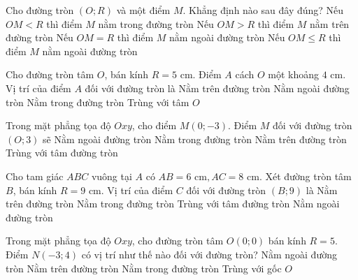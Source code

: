 \begin{ex}%
	Cho đường tròn $(O; R)$ và một điểm $M$. Khẳng định nào sau đây đúng?
	\choice
	{\True Nếu $OM < R$ thì điểm $M$ nằm trong đường tròn}
	{Nếu $OM > R$ thì điểm $M$ nằm trên đường tròn}
	{Nếu $OM = R$ thì điểm $M$ nằm ngoài đường tròn}
	{Nếu $OM \le R$ thì điểm $M$ nằm ngoài đường tròn}
\end{ex}

\begin{ex}%
	Cho đường tròn tâm $O$, bán kính $R = 5\text{ cm}$. Điểm $A$ cách $O$ một khoảng $4\text{ cm}$. Vị trí của điểm $A$ đối với đường tròn là
	\choice
	{Nằm trên đường tròn}
	{Nằm ngoài đường tròn}
	{\True Nằm trong đường tròn}
	{Trùng với tâm $O$}
\end{ex}

\begin{ex}%
	Trong mặt phẳng tọa độ $Oxy$, cho điểm $M(0; -3)$. Điểm $M$ đối với đường tròn $(O; 3)$ sẽ
	\choice
	{Nằm ngoài đường tròn}
	{Nằm trong đường tròn}
	{\True Nằm trên đường tròn}
	{Trùng với tâm đường tròn}
\end{ex}

\begin{ex}%
	Cho tam giác $ABC$ vuông tại $A$ có $AB = 6\text{ cm}, AC = 8\text{ cm}$. Xét đường tròn tâm $B$, bán kính $R = 9\text{ cm}$. Vị trí của điểm $C$ đối với đường tròn $(B; 9)$ là
	\choice
	{Nằm trên đường tròn}
	{Nằm trong đường tròn}
	{Trùng với tâm đường tròn}
	{\True Nằm ngoài đường tròn}
\end{ex}

\begin{ex}%
	Trong mặt phẳng tọa độ $Oxy$, cho đường tròn tâm $O(0;0)$ bán kính $R = 5$. Điểm $N(-3; 4)$ có vị trí như thế nào đối với đường tròn?
	\choice
	{Nằm ngoài đường tròn}
	{\True Nằm trên đường tròn}
	{Nằm trong đường tròn}
	{Trùng với gốc $O$}
\end{ex}

